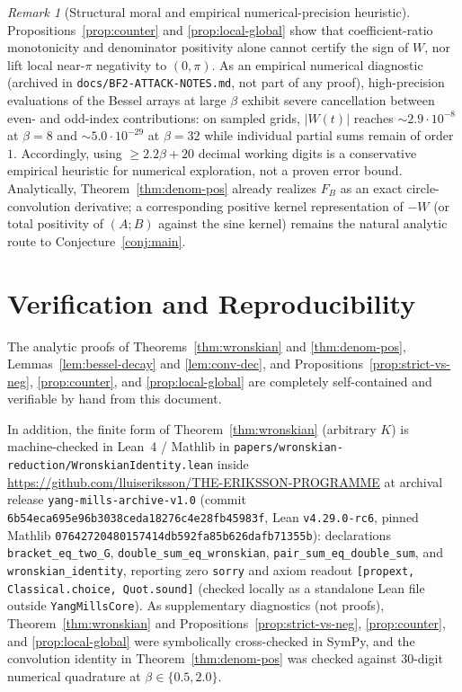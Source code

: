 \documentclass[11pt]{article}
\theoremstyle{remark}
\newtheorem{remark}[theorem]{Remark}
\begin{document}
\begin{remark}[Structural moral and empirical numerical-precision heuristic]
\label{rem:moral}
Propositions~\ref{prop:counter} and \ref{prop:local-global} show that coefficient-ratio
monotonicity and denominator positivity alone cannot certify the sign of $W$, nor lift
local near-$\pi$ negativity to $(0,\pi)$. As an empirical numerical diagnostic (archived
in \texttt{docs/BF2-ATTACK-NOTES.md}, not part of any proof), high-precision evaluations of
the Bessel arrays at large $\beta$ exhibit severe cancellation between even- and odd-index
contributions: on sampled grids, $|W(t)|$ reaches $\sim 2.9\cdot 10^{-8}$ at $\beta=8$ and
$\sim 5.0\cdot 10^{-29}$ at $\beta=32$ while individual partial sums remain of order $1$.
Accordingly, using $\ge 2.2\beta + 20$ decimal working digits is a conservative empirical
heuristic for numerical exploration, not a proven error bound. Analytically,
Theorem~\ref{thm:denom-pos} already realizes $F_B$ as an exact circle-convolution
derivative; a corresponding positive kernel representation of $-W$ (or total positivity of
$(A;B)$ against the sine kernel) remains the natural analytic route to
Conjecture~\ref{conj:main}.
\end{remark}

\section{Verification and Reproducibility}

The analytic proofs of Theorems~\ref{thm:wronskian} and \ref{thm:denom-pos},
Lemmas~\ref{lem:bessel-decay} and \ref{lem:conv-dec}, and
Propositions~\ref{prop:strict-vs-neg}, \ref{prop:counter}, and \ref{prop:local-global}
are completely self-contained and verifiable by hand from this document.

In addition, the finite form of Theorem~\ref{thm:wronskian} (arbitrary $K$) is
machine-checked in Lean~4 / Mathlib in \texttt{papers/wronskian-reduction/WronskianIdentity.lean}
inside \url{https://github.com/lluiseriksson/THE-ERIKSSON-PROGRAMME} at archival release
\texttt{yang-mills-archive-v1.0} (commit \texttt{6b54eca695e96b3038ceda18276c4e28fb45983f},
Lean \texttt{v4.29.0-rc6}, pinned Mathlib \texttt{07642720480157414db592fa85b626dafb71355b}):
declarations \texttt{bracket\_eq\_two\_G}, \texttt{double\_sum\_eq\_wronskian},
\texttt{pair\_sum\_eq\_double\_sum}, and \texttt{wronskian\_identity}, reporting zero
\texttt{sorry} and axiom readout \texttt{[propext, Classical.choice, Quot.sound]} (checked
locally as a standalone Lean file outside \texttt{YangMillsCore}). As supplementary
diagnostics (not proofs), Theorem~\ref{thm:wronskian} and Propositions~\ref{prop:strict-vs-neg},
\ref{prop:counter}, and \ref{prop:local-global} were symbolically cross-checked in SymPy,
and the convolution identity in Theorem~\ref{thm:denom-pos} was checked against 30-digit
numerical quadrature at $\beta \in \{0.5, 2.0\}$.
\end{document}
